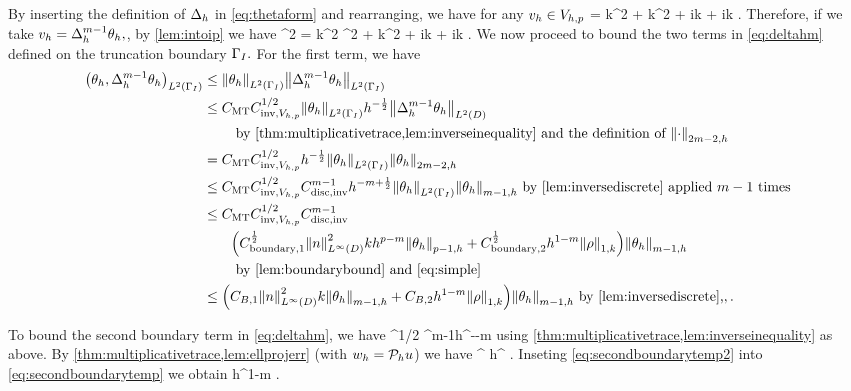 By inserting the definition of $\Delta_{h}$ in \cref{eq:thetaform} and rearranging, we have for any $v_{h} \in V_{h,p}$
\beqs
\IPLtD{\Deltah \thetah}{\vh} = k^2 \IPLtDn{\thetah}{\vh} + k^2\IPLtD{\Qhn \rho}{\vh} + ik \IPLtGI{\thetah}{\vh} + ik \IPLtGI{\rho}{\vh}.
\eeqs
Therefore, if we take $v_{h} = \Delta_{h}^{m-1}\theta_{h},$, by \cref{lem:intoip} we have
\beq\label{eq:deltahm}
\Nmh{\thetah}^2 = k^2 ^2 + k^2  + ik + ik .
\eeq
We now proceed to bound the two terms in \cref{eq:deltahm} defined on the truncation boundary $\Gamma_{I}.$ For the first term, we have
\begin{align}
\IPLtGI{\thetah}{\Deltah^{m-1}\thetah} &\leq \NLtGI{\thetah}\NLtGI{\Deltah^{m-1}\thetah}\nonumber\\
&\leq \CMT \CinvVhp^{1/2} \NLtGI{\thetah} h^{-\half} \NLtD{\Deltah^{m-1} \thetah}\\
&\quad\quad\text{ by \cref{thm:multiplicativetrace,lem:inverseinequality} and the definition of }\Nfn{2m-2,h}{\cdot}\nonumber\\
&= \CMT \CinvVhp^{1/2} h^{-\half}\NLtGI{\thetah}\Nfn{2m-2,h}{\thetah}\nonumber\\
&\leq \CMT \CinvVhp^{1/2} \Chinv^{m-1} h^{-m+\half} \NLtGI{\thetah}\Nfn{m-1,h}{\thetah} \text{ by \cref{lem:inversediscrete} applied } m-1 \text{ times}\nonumber\\
&\leq \CMT \CinvVhp^{1/2} \Chinv^{m-1}\nonumber\\
&\quad\quad\mleft(\Cboundaryo^{\half} \NLiD{n}^2 k h^{p-m} \Nfn{p-1,h}{\thetah} + \Cboundaryt^{\half} h^{1-m} \NW{\rho}\mright)\Nfn{m-1,h}{\thetah}\\
&\quad\quad\text{ by \cref{lem:boundarybound} and \cref{eq:simple}}\nonumber\\
&\leq \mleft(\CBo \NLiD{n}^2k \Nfn{m-1,h}{\thetah} + \CBt h^{1-m} \NW{\rho}\mright)\Nfn{m-1,h}{\thetah} \text{ by \cref{lem:inversediscrete},},\label{eq:firstboundary}.
\end{align}

To bound the second boundary term in \cref{eq:deltahm}, we have
\beq\label{eq:secondboundarytemp}
 \leq \CMT \CinvVhp^{1/2} \Chinv^{m-1}h^{-\half-m}\NLtGI{\rho}
\eeq
using \cref{thm:multiplicativetrace,lem:inverseinequality} as above. By \cref{thm:multiplicativetrace,lem:ellprojerr} (with $w_{h} = \mathcal P_{h} u$) we have
\beq\label{eq:secondboundarytemp2}
\NLtGI{\rho} \leq \CMT {}^{\half} h^{\half} \NW{\rho}.
\eeq
Inseting \cref{eq:secondboundarytemp2} into \cref{eq:secondboundarytemp} we obtain
\beq\label{eq:secondboundary}
 \leq \CBth h^{1-m} \NW{\rho} .
\eeq

